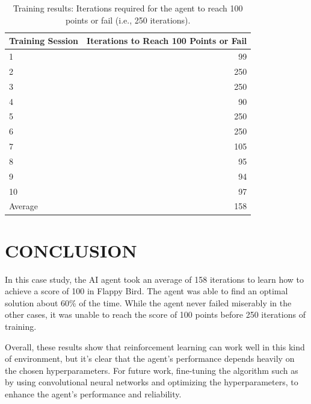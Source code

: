 \documentclass{lutmscthesis}[2017/10/03]
\begin{document}

\begin{table}[h!]
    \caption{Training results: Iterations required for the agent to reach 100 points or fail (i.e., 250 iterations).}
    \label{tab:training_results}
    \centering
    \small
    \begin{tabular}{|l|r|}
        \hline
        \textbf{Training Session} & \textbf{Iterations to Reach 100 Points or Fail} \\
        \hline
        1 & 99 \\
        2 & 250 \\
        3 & 250 \\
        4 & 90 \\
        5 & 250 \\
        6 & 250 \\
        7 & 105 \\
        8 & 95 \\
        9 & 94 \\
        10 & 97 \\
        \hline
        Average & 158 \\
        \hline
    \end{tabular}
\end{table}

\newpage
\section{CONCLUSION}
In this case study, the AI agent took an average of 158 iterations to learn how to achieve a score of  100 in Flappy Bird. The agent was able to find an optimal solution about 60\% of the time. While the agent never failed miserably in the other cases, it was unable to reach the score of 100 points before 250 iterations of training.

Overall, these results show that reinforcement learning can work well in this kind of environment, but it’s clear that the agent's performance depends heavily on the chosen hyperparameters. For future work, fine-tuning the algorithm such as by using convolutional neural networks and optimizing the hyperparameters, to enhance the agent's performance and reliability.
\end{document}

